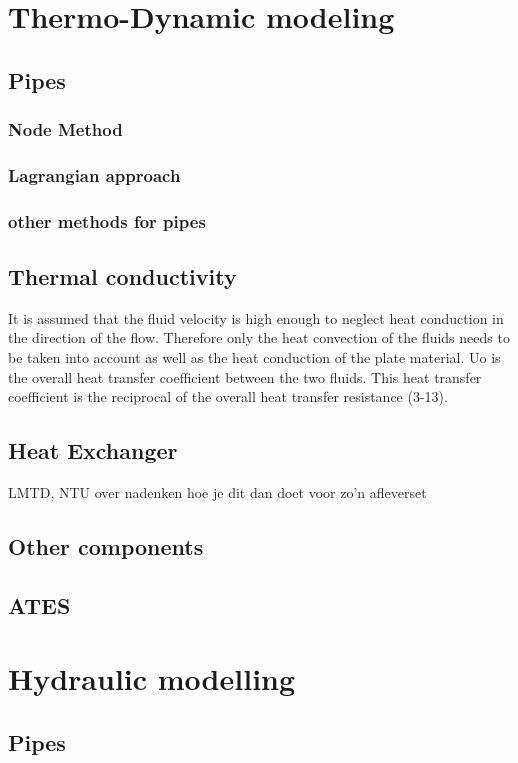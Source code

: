 \section{Thermo-Dynamic modeling}
\subsection{Pipes}
\subsubsection{Node Method}
\subsubsection{Lagrangian approach}
\subsubsection{other methods for pipes}
\subsection{Thermal conductivity}
It is assumed that the fluid velocity is high enough to neglect heat conduction in the direction of the flow. Therefore only the heat convection of the fluids needs to be taken into account as well as the heat conduction of the plate material. Uo is the overall heat transfer coefficient between the two fluids. This heat transfer coefficient is the reciprocal of the overall heat transfer resistance (3-13). 
\subsection{Heat Exchanger}
LMTD, NTU
over nadenken hoe je dit dan doet voor zo'n afleverset
\subsection{Other components}
\subsection{ATES}
\section{Hydraulic modelling}
\subsection{Pipes}
